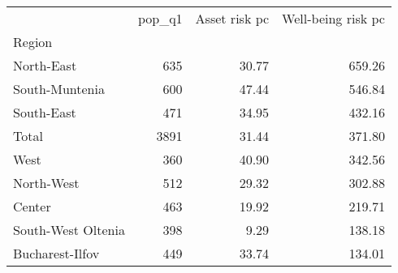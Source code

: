 \begin{tabular}{lrrr}
\toprule
{} &  pop\_q1 &  Asset risk pc &  Well-being risk pc \\
Region             &         &                &                     \\
\midrule
North-East         &     635 &          30.77 &              659.26 \\
South-Muntenia     &     600 &          47.44 &              546.84 \\
South-East         &     471 &          34.95 &              432.16 \\
Total              &    3891 &          31.44 &              371.80 \\
West               &     360 &          40.90 &              342.56 \\
North-West         &     512 &          29.32 &              302.88 \\
Center             &     463 &          19.92 &              219.71 \\
South-West Oltenia &     398 &           9.29 &              138.18 \\
Bucharest-Ilfov    &     449 &          33.74 &              134.01 \\
\bottomrule
\end{tabular}
